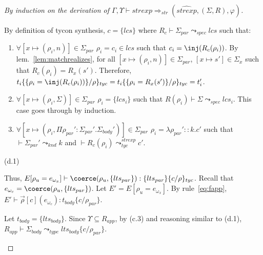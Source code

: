 \begin{proof}[By induction on the derivation of $\Gamma,\Upsilon\vdash
  strexp \Rightarrow_{str} (\widehat{strexp}, (\Sigma,R),\varphi)$]
\begin{description}
\begin{description}
By definition of tycon synthesis, $c = \{ lcs \}$ where $R_c\vdash
\Sigma_{par} \leadsto_{spec} lcs$ such that:
\begin{enumerate}
\item $\forall [x\mapsto(\rho_i,n)]\in\Sigma_{par}$ $\rho_i =
c_i\in lcs$ such that $c_i = \inj(R_c(\rho_i))$.
 By lem.~\ref{lem:matchrealizes}, for all $[x\mapsto (\rho_i, n)]\in
\Sigma_{par}$, $[x\mapsto s']\in\Sigma_x$ such that $R_c(\rho_i)=R_x(s')$. 
Therefore, $t_i\{\{\rho_i=\inj(R_c(\rho_i))\}/\rho\}_{tyc}=
t_i\{\{\rho_i=R_x(s')\}/\rho\}_{tyc} = t_i'$.
\item $\forall [x\mapsto(\rho_i,\Sigma)]\in \Sigma_{par}$ $\rho_i = \{
  lcs_i \}$ such that $R(\rho_i)\vdash \Sigma \leadsto_{spec}
  lcs_i$. This case goes through by induction. 
\item $\forall
  [x\mapsto(\rho_i,\Pi\rho_{par}':\Sigma_{par}'.\Sigma_{body}')]
\in\Sigma_{par}$ $\rho_i =
  \lambda\rho_{par}'::k.c'$ such that $\vdash \Sigma_{par}'
  \leadsto_{knd} k$ and $\vdash R_c(\rho_i) \leadsto^{strexp}_{tyc}
  c'$. 
\end{enumerate} (d.1)

Thus, $E[\rho_u=e_{\omega_x}] \vdash \coerce(\rho_u, \{ lts_{par} \})
: \{lts_{par}\}\{c/\rho\}_{tyc}$. 
Recall that $e_{\omega_c} =  \coerce(\rho_u, \{ lts_{par} \})$. 
Let $E' = E[\rho_u=e_{\omega_x}]$. 
  By rule~\ref{eq:fapp}, $E'\vdash  
  \vec{\rho}[c](e_{\omega_c}) : t_{body}\{c/\rho_{par}\}$.

Let $t_{body} = \{ lts_{body} \}$. 
Since $\Upsilon \subseteq R_{app}$, by (c.3) and reasoning similar to (d.1), 
$R_{app} \vdash \Sigma_{body} \leadsto_{type}
lts_{body}\{c/\rho_{par}\}$. 




 








\end{description}
\end{description}
\end{proof}
